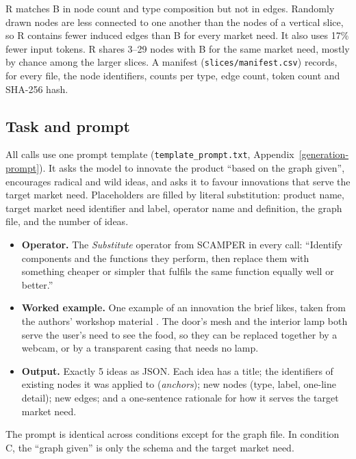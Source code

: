 R matches B in node count and type composition but not in edges. Randomly drawn nodes are less connected to one another than the nodes of a vertical slice, so R contains fewer induced edges than B for every market need. It also uses 17\% fewer input tokens. R shares 3--29 nodes with B for the same market need, mostly by chance among the larger slices. A manifest (\texttt{slices/manifest.csv}) records, for every file, the node identifiers, counts per type, edge count, token count and SHA-256 hash.

\hypertarget{task-and-prompt}{%
\subsection{Task and prompt}\label{task-and-prompt}}

All calls use one prompt template (\texttt{template\_prompt.txt}, Appendix~\ref{generation-prompt}). It asks the model to innovate the product ``based on the graph given'', encourages radical and wild ideas, and asks it to favour innovations that serve the target market need. Placeholders are filled by literal substitution: product name, target market need identifier and label, operator name and definition, the graph file, and the number of ideas.

\begin{itemize}
\tightlist
\item
  \textbf{Operator.} The \emph{Substitute} operator from SCAMPER \citep{Eberle1971} in every call: ``Identify components and the functions they perform, then replace them with something cheaper or simpler that fulfils the same function equally well or better.''
\item
  \textbf{Worked example.} One example of an innovation the brief likes, taken from the authors' workshop material \citep{berengueres2014}. The door's mesh and the interior lamp both serve the user's need to see the food, so they can be replaced together by a webcam, or by a transparent casing that needs no lamp.
\item
  \textbf{Output.} Exactly 5 ideas as JSON. Each idea has a title; the identifiers of existing nodes it was applied to (\emph{anchors}); new nodes (type, label, one-line detail); new edges; and a one-sentence rationale for how it serves the target market need.
\end{itemize}

The prompt is identical across conditions except for the graph file. In condition C, the ``graph given'' is only the schema and the target market need.

